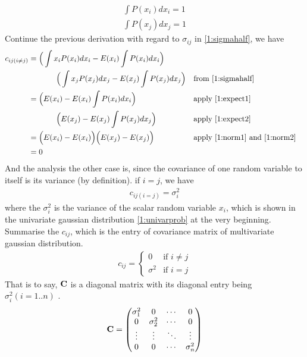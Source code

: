 \documentclass[11pt,a4paper]{article}
\newcommand{\htab}{\hspace*{0.63cm}}
\newcommand{\dhtab}{\hspace*{1.26cm}}
\begin{document}
\begin{align}
    \int P(x_{i}) d x_{i} = 1 \label{1:norm1}\\
    \int P(x_{j}) d x_{j} = 1 \label{1:norm2}
    \end{align}
\htab Continue the previous derivation with regard to $\sigma_{ij}$ in \eqref{1:sigmahalf}, we have
\begin{align}
    c_{ij (i\neq j)}
        &= \Big( \int x_{i}  P(x_{i}) d x_{i} -  E(x_{i}) \int P(x_{i}) d x_{i} \Big)   \nonumber \\
         &\dhtab  \Big(\int x_{j}P(x_{j}) d x_{j} -  E(x_{j}) \int P(x_{j})d x_{j}  \Big) 
        &&\mbox{from \eqref{1:sigmahalf} }\\
        &= \Big( E(x_{i}) -  E(x_{i}) \int P(x_{i}) d x_{i} \Big) 
        &&\mbox{apply \eqref{1:expect1}} \nonumber \\
         &\dhtab  \Big(E(x_{j}) -  E(x_{j}) \int P(x_{j})d x_{j}  \Big) 
        &&\mbox{apply \eqref{1:expect2}}  \\
        &= \Big( E(x_{i}) -  E(x_{i})  \Big)  \Big(E(x_{j}) -  E(x_{j})  \Big) 
        &&\mbox{apply \eqref{1:norm1} and \eqref{1:norm2}}  \\
        &= 0 
    \end{align}
\htab And the analysis the other case is, since the covariance of one random variable 
to itself is its variance (by definition). if $i = j$, we have 
\begin{align}
    c_{ij (i = j)} = \sigma_{i}^{2}
    \end{align}
\htab where the $\sigma_{i}^{2}$ is the variance of the scalar random variable $x_{i}$,
    which is shown in the univariate gaussian distribution \eqref{1:univarprob} at the very beginning. \\
\htab Summarise the $c_{ij}$, which is the entry of covariance matrix of 
    multivariate gaussian distribution.
    \begin{align}
        c_{ij} = \begin{cases}
            0 & \text{if } i \neq j \\
            \sigma^{2} & \text{if }  i = j
        \end{cases}
        \end{align}
\htab That is to say, $\mathbf{C}$ is a diagonal matrix with its diagonal entry being $\sigma_{i}^{2} (i=1..n)$ .
\begin{align}
    \mathbf{C} = \begin{pmatrix}
        \sigma_{1}^{2} & 0 & \cdots & 0 \\
        0 & \sigma_{2}^{2} & \cdots & 0 \\
        \vdots & \vdots & \ddots & \vdots \\
        0 & 0 & \cdots & \sigma_{n}^{2}
    \end{pmatrix} \label{1:C}
\end{align}
\end{document}

